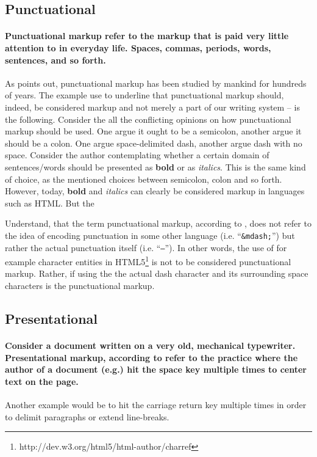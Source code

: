\documentclass{scrreprt}
\begin{document}
\subsection{Punctuational}
\paragraph{Punctuational markup refer to the markup that is paid very little attention to in everyday life. Spaces, commas, periods, words, sentences, and so forth.} As \citet{coombs} points out, punctuational markup has been studied by mankind for hundreds of years. The example \citet{coombs} use to underline that punctuational markup should, indeed, be considered markup and not merely a part of our writing system -- is the following. Consider the all the conflicting opinions on how punctuational markup should be used. One argue it ought to be a  semicolon, another argue it should be a colon. One argue space-delimited dash, another argue dash with no space. Consider the author contemplating whether a certain domain of sentences/words should be presented as \textbf{bold} or as \textit{italics}. This is the same kind of choice, as the mentioned choices between semicolon, colon and so forth. However, today, \textbf{bold} and \textit{italics} can clearly be considered markup in languages such as HTML. But the 

Understand, that the term punctuational markup, according to \citet{coombs}, does not refer to the idea of encoding punctuation in some other language (i.e. ``\texttt{\&mdash;}'') but rather the actual punctuation itself (i.e. ``\texttt{--}''). In other words, the use of for example character entities in HTML5\footnote{http://dev.w3.org/html5/html-author/charref} is not to be considered punctuational markup. Rather, if using the the actual dash character and its surrounding space characters is the punctuational markup.




\subsection{Presentational}
\paragraph{Consider a document written on a very old, mechanical typewriter. Presentational markup, according to \citet{coombs} refer to the practice where the author of a document (e.g.) hit the space key multiple times to center text on the page.} Another example would be to hit the carriage return key multiple times in order to delimit paragraphs or extend line-breaks.
\end{document}
